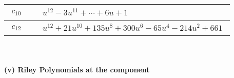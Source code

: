 \documentclass[1p]{elsarticle_modified}
\theoremstyle{definition}
\begin{document}
\begin{tabular}{m{50pt}|m{274pt}}
\hline $$\begin{aligned}c_{10}\end{aligned}$$&$\begin{aligned}
&u^{12}-3 u^{11}+\cdots+6 u+1
\end{aligned}$\\
\hline $$\begin{aligned}c_{12}\end{aligned}$$&$\begin{aligned}
&u^{12}+21 u^{10}+135 u^8+300 u^6-65 u^4-214 u^2+661
\end{aligned}$\\
\hline
\end{tabular}\\~\\
\newpage\renewcommand{\arraystretch}{1}
\flushleft \textbf{(v) Riley Polynomials at the component}\newline \\
\end{document}

